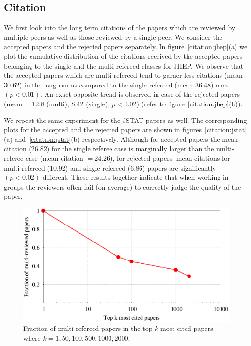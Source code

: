 \subsection{Citation}

We first look into the long term citations of the papers which are reviewed by multiple peers as well as those reviewed by a single peer. 
We consider the accepted papers and the rejected papers separately. 
In figure~\ref{citation:jhep}(a) we plot the cumulative distribution of the citations received by the accepted papers belonging to the single and the multi-refereed classes 
for JHEP. 
We observe that the accepted papers which are multi-refereed tend to garner less citations (mean 30.62) in the long run as compared to the single-refereed 
(mean 36.48) ones $(p < 0.01)$. 
An exact opposite trend is observed in case of the rejected papers (mean = 12.8 (multi), 8.42 (single),  $p< 0.02$) (refer to figure~\ref{citation:jhep}(b)). 

We repeat the same experiment for the JSTAT papers as well. The corresponding plots for the accepted and the rejected papers are shown in 
figures~\ref{citation:jstat}(a) and~\ref{citation:jstat}(b) respectively. Although for accepted papers the mean citation ($26.82$) for the single referee 
case is marginally larger than the 
multi-referee case (mean citation $= 24.26$), for rejected papers,    
mean citations for multi-refereed (10.92) and single-refereed (6.86) papers are significantly $(p < 0.02)$ different.
These results together 
indicate that when working in groups the reviewers often fail (on average) to correctly judge the quality of the paper.

\begin{figure}
 \centering
 \includegraphics[scale = 0.25]{./texfiles/Chapter_4/cikm_17/figures/best_paper.eps}
 \caption{\label{fig:best} Fraction of multi-refereed papers in the top $k$ most cited papers where $k = 1,50,100,500,1000,2000$.}
 \vspace{4mm}
\end{figure}

